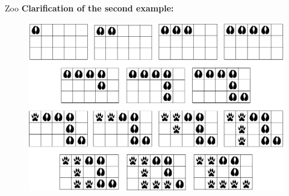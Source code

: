 \begin{statement}[
  problempoints=110,
  timelimit=2 seconds,
  memorylimit=512 MiB,
]{Zoo}
\textbf{Clarification of the second example:}

\begin{figure}
\centering
\includegraphics[width=\textwidth]{img/escape.png}
\end{figure}

\end{statement}


